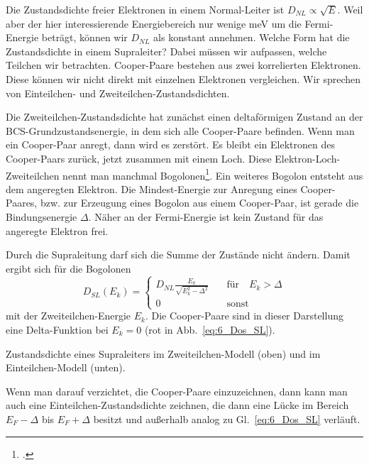 Die Zustandsdichte freier Elektronen in einem Normal-Leiter ist $D_{NL} \propto \sqrt{E}$. Weil aber der hier interessierende Energiebereich nur wenige meV um die Fermi-Energie beträgt, können wir $D_{NL}$ als konstant annehmen. Welche Form hat die Zustandsdichte in einem Supraleiter? Dabei müssen wir aufpassen, welche Teilchen wir betrachten. Cooper-Paare bestehen aus zwei korrelierten Elektronen. Diese können wir nicht direkt mit einzelnen Elektronen vergleichen. Wir sprechen von Einteilchen- und Zweiteilchen-Zustandsdichten.

Die Zweiteilchen-Zustandsdichte hat zunächst einen deltaförmigen Zustand an der BCS-Grundzustandsenergie, in dem sich alle Cooper-Paare befinden. Wenn man ein Cooper-Paar anregt, dann wird es zerstört. Es bleibt ein Elektronen des Cooper-Paars zurück, jetzt zusammen mit einem Loch. Diese Elektron-Loch-Zweiteilchen nennt man manchmal Bogolonen\footcite{Kopitzki_FK}. Ein weiteres Bogolon entsteht aus dem angeregten Elektron. Die Mindest-Energie zur Anregung eines Cooper-Paares, bzw. zur Erzeugung eines Bogolon aus einem Cooper-Paar, ist gerade die Bindungsenergie $\Delta$. Näher an der Fermi-Energie ist kein Zustand für das angeregte Elektron frei.

Durch die Supraleitung darf sich die Summe der Zustände nicht ändern. Damit ergibt sich für die Bogolonen 
\begin{equation}
    D_{SL}(E_k) = \left\{ 
    \begin{matrix}
    D_{NL} \frac{E_k}{\sqrt{E_k^2 - \Delta^2}} \quad &\text{für} \quad E_k > \Delta \\
     0 & \text{sonst} 
    \end{matrix}
    \right. \label{eq:6_Dos_SL}
\end{equation}
mit der Zweiteilchen-Energie $E_k$. Die Cooper-Paare sind in dieser Darstellung eine Delta-Funktion bei $E_k = 0$ (rot in Abb.~\ref{eq:6_Dos_SL}).

\begin{marginfigure}[-40mm]


    \caption{Zustandsdichte eines Supraleiters im Zweiteilchen-Modell (oben) und im Einteilchen-Modell (unten).}
\end{marginfigure}

Wenn man darauf verzichtet, die Cooper-Paare einzuzeichnen, dann kann man auch eine Einteilchen-Zustandsdichte zeichnen, die dann eine Lücke im Bereich $E_F - \Delta$ bis $E_F + \Delta$ besitzt und außerhalb analog zu Gl.~\ref{eq:6_Dos_SL} verläuft.


